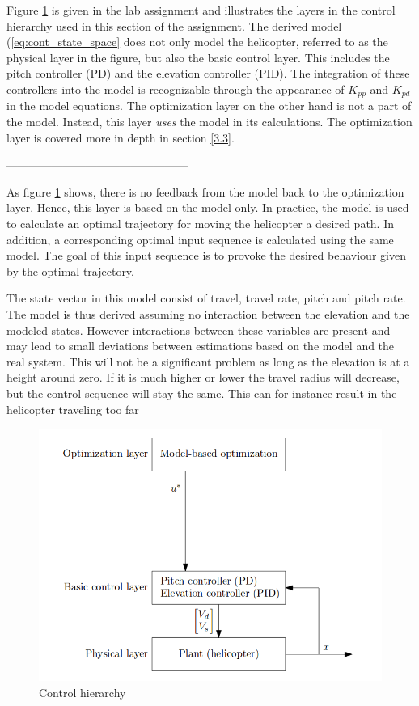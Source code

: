 \documentclass[a4paper, 12pt]{article}\usepackage[utf8]{inputenc}
\begin{document}
Figure \ref{fig:chart_2.1} is given in the lab assignment and illustrates the layers in the control hierarchy used in this section of the assignment. The derived model (\ref{eq:cont_state_space} does not only model the helicopter, referred to as the physical layer in the figure, but also the basic control layer. This includes the pitch controller (PD) and the elevation controller (PID). The integration of these controllers into the model is recognizable through the appearance of $K_{pp}$ and $K_{pd}$ in the model equations. The optimization layer on the other hand is not a part of the model. Instead, this layer \textit{uses} the model in its calculations. The optimization layer is covered more in depth in section \ref{3.3}.

------------------------------------------------

As figure \ref{fig:chart_2.1} shows, there is no feedback from the model back to the optimization layer. Hence, this layer is based on the model only. In practice, the model is used to calculate an optimal trajectory for moving the helicopter a desired path. In addition, a corresponding optimal input sequence is calculated using the same model. The goal of this input sequence is to provoke the desired behaviour given by the optimal trajectory.

The state vector in this model consist of travel, travel rate, pitch and pitch rate. The model is thus derived assuming no interaction between the elevation and the modeled states. However interactions between these variables are present and may lead to small deviations between estimations based on the model and the real system. This will not be a significant problem as long as the elevation is at a height around zero. If it is much higher or lower the travel radius will decrease, but the control sequence will stay the same. This can for instance result in the helicopter traveling too far


\begin{figure}[H]
    \centering
    \includegraphics[width=140mm]{Part2/fig7_oppg.png}
    \caption{Control hierarchy}
    \label{fig:chart_2.1}
\end{figure}
\end{document}
